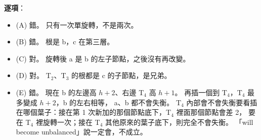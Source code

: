 \begin{pastsoln}
\textbf{逐項}：
\begin{itemize}
\item (A) 錯。 只有一次單旋轉，不是兩次。
\item (B) 錯。 根是 b，c 在第三層。
\item (C) 對。 旋轉後 a 是 b 的左子節點，之後沒有再改變。
\item (D) 對。 T$_2$、T$_3$ 的根都是 c 的子節點，是兄弟。
\item (E) 錯。 現在 b 的左邊高 $h+2$、右邊 T$_4$ 高 $h+1$。 再插一個到 T$_4$，T$_4$ 最多變成 $h+2$，b 的左右相等，
a、b 都不會失衡。 T$_4$ 內部會不會失衡要看插在哪個葉子：接在第 1 次新加的那個節點底下，T$_4$ 裡面那個節點會差 2，
要在 T$_4$ 裡旋轉一次；接在 T$_4$ 其他原來的葉子底下，則完全不會失衡。 「will become unbalanced」說一定會，不成立。
\end{itemize}
\end{pastsoln}
